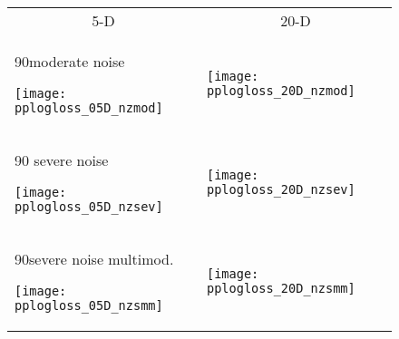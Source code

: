 \documentclass[sigconf]{acmart}
\newcommand{\rot}[2][2.5]{
  \hspace*{-3.5\baselineskip}%
  \begin{rotate}{90}\hspace{#1em}#2
  \end{rotate}}
\begin{document}
{%


\begin{figure}
\begin{tabular}{@{}l@{}@{}l@{}}
\multicolumn{1}{c}{5-D} & \multicolumn{1}{c}{20-D}\\
\rot{moderate noise}
\hspace*{-1mm}
\texttt{[image: pplogloss\_05D\_nzmod]} &
\texttt{[image: pplogloss\_20D\_nzmod]} \\
\rot{$\,\,$severe noise}
\hspace*{-1mm}
\texttt{[image: pplogloss\_05D\_nzsev]} &
\texttt{[image: pplogloss\_20D\_nzsev]} \\
\rot[0.5]{severe noise multimod.}
\hspace*{-1mm}
\texttt{[image: pplogloss\_05D\_nzsmm]} &
\texttt{[image: pplogloss\_20D\_nzsmm]}
\end{tabular}
\caption{\label{fig:ERTlogloss}%
\bbobloglossfigurecaption{}
}
\end{figure}



}{} %
\end{document}
